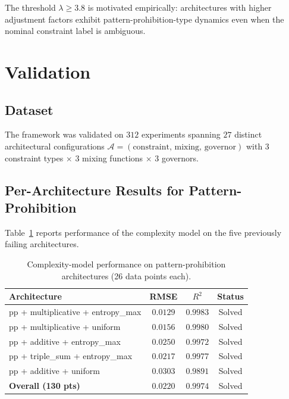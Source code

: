 \documentclass[12pt,a4paper]{article}
\begin{document}
The threshold $\lambda \geq 3.8$ is motivated empirically: architectures with higher adjustment factors exhibit pattern-prohibition-type dynamics even when the nominal constraint label is ambiguous.

\section{Validation}\label{sec:validation}

\subsection{Dataset}

The framework was validated on $312$ experiments spanning $27$ distinct architectural configurations $\mathcal{A} = (\text{constraint, mixing, governor})$ with 3 constraint types $\times$ 3 mixing functions $\times$ 3 governors.

\subsection{Per-Architecture Results for Pattern-Prohibition}

Table~\ref{tab:per_arch} reports performance of the complexity model on the five previously failing architectures.

\begin{table}[ht]
\centering
\caption{Complexity-model performance on pattern-prohibition architectures (26 data points each).}
\label{tab:per_arch}
\begin{tabular}{lccc}
\toprule
Architecture & RMSE & $R^{2}$ & Status \\
\midrule
pp + multiplicative + entropy\_max  & $0.0129$ & $0.9983$ & Solved \\
pp + multiplicative + uniform        & $0.0156$ & $0.9980$ & Solved \\
pp + additive + entropy\_max         & $0.0250$ & $0.9972$ & Solved \\
pp + triple\_sum + entropy\_max      & $0.0217$ & $0.9977$ & Solved \\
pp + additive + uniform              & $0.0303$ & $0.9891$ & Solved \\
\midrule
\textbf{Overall (130 pts)}          & $\mathbf{0.0220}$ & $\mathbf{0.9974}$ & Solved \\
\bottomrule
\end{tabular}
\end{table}
\end{document}
